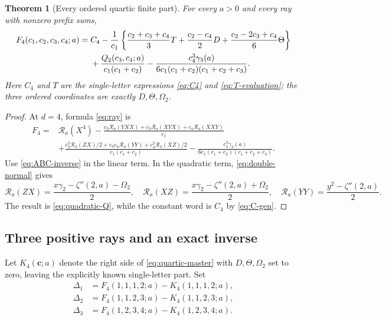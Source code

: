 \documentclass[11pt]{article}
\numberwithin{equation}{section}
\newtheorem{theorem}{Theorem}[section]
\theoremstyle{definition}
\newcommand{\R}{\mathcal R}
\newcommand{\bbc}{\boldsymbol c}
\begin{document}
\begin{theorem}[Every ordered quartic finite part]\label{thm:quartic}
For every $a>0$ and every ray with nonzero prefix sums,
\begin{align}\label{eq:quartic-master}
 F_4(c_1,c_2,c_3,c_4;a)={}&C_4
 -\frac1{c_1}\left\{\frac{c_2+c_3+c_4}{3}T
                 +\frac{c_2-c_4}{2}D
                 +\frac{c_2-2c_3+c_4}{6}\Theta\right\}\notag\\
 &+\frac{Q_2(c_3,c_4;a)}{c_1(c_1+c_2)}
 -\frac{c_4^3\gamma_3(a)}{6c_1(c_1+c_2)(c_1+c_2+c_3)}.
\end{align}
Here $C_4$ and $T$ are the single-letter expressions
\eqref{eq:C4} and \eqref{eq:T-evaluation}; the three ordered coordinates
are exactly $D,\Theta,\Omega_2$.
\end{theorem}
\begin{proof}
At $d=4$, formula \eqref{eq:ray} is
\begin{align*}
 F_4={}&\R_a(X^4)
 -\frac{c_2\R_a(YXX)+c_3\R_a(XYX)+c_4\R_a(XXY)}{c_1}\\
 &+\frac{c_3^2\R_a(ZX)/2+c_3c_4\R_a(YY)+c_4^2\R_a(XZ)/2}
          {c_1(c_1+c_2)}
 -\frac{c_4^3\gamma_3(a)}{6c_1(c_1+c_2)(c_1+c_2+c_3)}.
\end{align*}
Use \eqref{eq:ABC-inverse} in the linear term. In the quadratic term,
\eqref{eq:double-normal} gives
\[
 \R_a(ZX)=\frac{x\gamma_2-\zeta''(2,a)-\Omega_2}{2},\quad
 \R_a(XZ)=\frac{x\gamma_2-\zeta''(2,a)+\Omega_2}{2},\quad
 \R_a(YY)=\frac{y^2-\zeta''(2,a)}2.
\]
The result is \eqref{eq:quadratic-Q}, while the constant word is
$C_4$ by \eqref{eq:C-gen}.
\end{proof}

\subsection{Three positive rays and an exact inverse}
Let $K_4(\bbc;a)$ denote the right side of \eqref{eq:quartic-master}
with $D,\Theta,\Omega_2$ set to zero, leaving the explicitly known
single-letter part. Set
\begin{align*}
 \Delta_1&=F_4(1,1,1,2;a)-K_4(1,1,1,2;a),\\
 \Delta_2&=F_4(1,1,2,3;a)-K_4(1,1,2,3;a),\\
 \Delta_3&=F_4(1,2,3,4;a)-K_4(1,2,3,4;a).
\end{align*}
\end{document}
